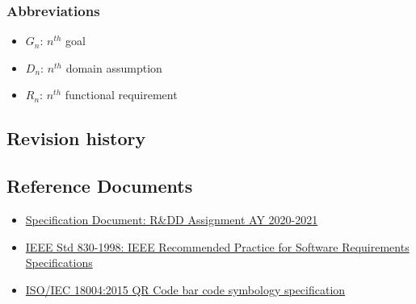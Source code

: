 \subsubsection{Abbreviations}
\begin{itemize}
    \item \textbf{$G_n$}: $n^{th}$ goal
    \item \textbf{$D_n$}: $n^{th}$ domain assumption
    \item \textbf{$R_n$}: $n^{th}$ functional requirement
\end{itemize}
\subsection{Revision history}


\subsection{Reference Documents}
\begin{itemize}
    \item \href{https://beep.metid.polimi.it/documents/121843524/23d1869d-ab17-4e36-979e-f1ccbc59be24}{Specification Document: R\&DD Assignment AY 2020-2021}
    \item \href{https://standards.ieee.org/standard/29148-2011.html}{IEEE Std 830-1998: IEEE Recommended Practice for Software Requirements Specifications}
    \item \href{https://www.iso.org/standard/62021.html}{ISO/IEC 18004:2015 QR Code bar code symbology specification}
\end{itemize}



